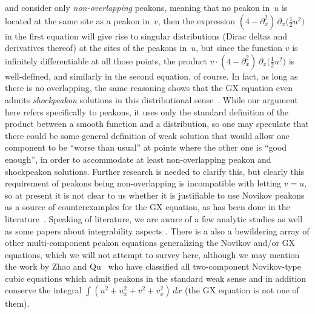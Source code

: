 \documentclass[10pt,a4paper]{article} \pdfoutput=1 
\begin{document}
and consider only \emph{non-overlapping} peakons,
meaning that no peakon in~$u$ is located at the same site as a peakon in~$v$,
then the expression $(4 - \partial_x^2) \, \partial_x \bigl( \tfrac12 u^2 \bigr)$ in the first equation
will give rise to singular distributions (Dirac deltas and derivatives thereof)
at the sites of the peakons in~$u$,
but since the function $v$ is infinitely differentiable at all those points,
the product
$v \cdot (4 - \partial_x^2) \, \partial_x \bigl( \tfrac12 u^2 \bigr)$
is well-defined,
and similarly in the second equation, of course.
In fact, as long as there is no overlapping, the same reasoning shows that
the GX equation even admits \emph{shockpeakon} solutions in this distributional
sense~\cite{lundmark-szmigielski:2017:GX-dynamics-interlacing}.
While our argument here refers specifically to peakons, it uses only the standard definition
of the product between a smooth function and a distribution,
so one may speculate that there could be some general definition of weak solution
that would allow one component to be ``worse than usual'' at points where the other one is ``good enough'',
in order to accommodate at least non-overlapping peakon and shockpeakon solutions.
Further research is needed to clarify this,
but clearly this requirement of peakons being non-overlapping
is incompatible with letting $v=u$,
so at present it is not clear to us whether it is justifiable to use
Novikov peakons as a source of counterexamples for the GX equation,
as has been done in the literature~\cite{himonas-mantzavinos:2016:GX-initial-value-problem}.
Speaking of literature, we are aware of a few analytic studies
\cite{mi-mu-tao:2013:GX-cauchy-problem,
  tang-liu:2015:GX-cauchy-problem,
  himonas-mantzavinos:2016:GX-initial-value-problem,
  barostichi-himonas-petronilho:2016:ovsyannikov-theorem,
  chen-qiao-zhou:2019:GX-persistence-properties-wavebreaking-criteria,
  wang-chong-wu:2021:GX-cauchy-problem}
as well as some papers about integrability aspects
\cite{li-liu:2013:GX-bihamiltonian,
  li-niu:2014:GX-reciprocal,
  li-wang:2017:GX-new-liouville-transformation,
  li-liu:2022p:GX-smooth-multisoliton-solutions}.
There is a also a bewildering array of other multi-component peakon equations
generalizing the Novikov and/or GX equations, which we will not attempt to survey here,
although we may mention the work by Zhao and Qu~\cite{zhao-qu:2021:two-component-novikov-type-system-peakons-H1}
who have classified all two-component Novikov-type cubic equations which admit peakons in
the standard weak sense and in addition conserve the integral $\int (u^2 + u_x^2 + v^2 + v_x^2) \, dx$
(the GX equation is not one of them).
\end{document}
